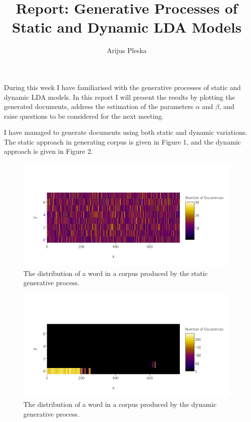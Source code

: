 \documentclass{article}
\begin{document}
\title{Report: Generative Processes of Static and Dynamic LDA Models}
\author{Arijus Pleska}
\maketitle


\par During this week I have familiarised with the generative processes of static and dynamic LDA models. In this report I will present the results by plotting the generated documents, address the estimation of the parameters $\alpha$ and $\beta$, and raise questions to be considered for the next meeting.

\par I have managed to generate documents using both static and dynamic variations. The static approach in generating corpus is given in Figure 1, and the dynamic approach is given in Figure 2.

\begin{figure}[H]
  \centering
  \includegraphics[width=\textwidth]{static}
  \caption{The distribution of a word in a corpus produced by the static generative process.}
  \label{fig:static}
\end{figure}

\begin{figure}[H]
  \centering
  \includegraphics[width=\textwidth]{dynamic}
  \caption{The distribution of a word in a corpus produced by the dynamic generative process.}
  \label{fig:dynamic}
\end{figure}
\end{document}
